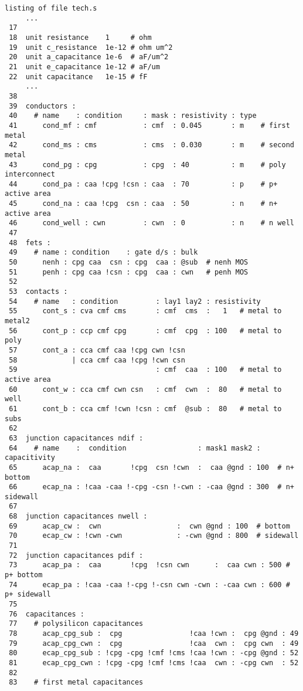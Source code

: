 \small \begin{Verbatim}[frame=single]
listing of file tech.s
     ...
 17
 18  unit resistance    1     # ohm
 19  unit c_resistance  1e-12 # ohm um^2
 20  unit a_capacitance 1e-6  # aF/um^2
 21  unit e_capacitance 1e-12 # aF/um
 22  unit capacitance   1e-15 # fF
     ...
 38
 39  conductors :
 40    # name    : condition     : mask : resistivity : type
 41      cond_mf : cmf           : cmf  : 0.045       : m    # first metal
 42      cond_ms : cms           : cms  : 0.030       : m    # second metal
 43      cond_pg : cpg           : cpg  : 40          : m    # poly interconnect
 44      cond_pa : caa !cpg !csn : caa  : 70          : p    # p+ active area
 45      cond_na : caa !cpg  csn : caa  : 50          : n    # n+ active area
 46      cond_well : cwn         : cwn  : 0           : n    # n well
 47
 48  fets :
 49    # name : condition    : gate d/s : bulk
 50      nenh : cpg caa  csn : cpg  caa : @sub  # nenh MOS
 51      penh : cpg caa !csn : cpg  caa : cwn   # penh MOS
 52
 53  contacts :
 54    # name   : condition         : lay1 lay2 : resistivity
 55      cont_s : cva cmf cms       : cmf  cms  :   1   # metal to metal2
 56      cont_p : ccp cmf cpg       : cmf  cpg  : 100   # metal to poly
 57      cont_a : cca cmf caa !cpg cwn !csn
 58             | cca cmf caa !cpg !cwn csn
 59                                 : cmf  caa  : 100   # metal to active area
 60      cont_w : cca cmf cwn csn   : cmf  cwn  :  80   # metal to well
 61      cont_b : cca cmf !cwn !csn : cmf  @sub :  80   # metal to subs
 62
 63  junction capacitances ndif :
 64    # name    :  condition                 : mask1 mask2 : capacitivity
 65      acap_na :  caa       !cpg  csn !cwn  :  caa @gnd : 100  # n+ bottom
 66      ecap_na : !caa -caa !-cpg -csn !-cwn : -caa @gnd : 300  # n+ sidewall
 67
 68  junction capacitances nwell :
 69      acap_cw :  cwn                  :  cwn @gnd : 100  # bottom
 70      ecap_cw : !cwn -cwn             : -cwn @gnd : 800  # sidewall
 71
 72  junction capacitances pdif :
 73      acap_pa :  caa       !cpg  !csn cwn      :  caa cwn : 500 # p+ bottom
 74      ecap_pa : !caa -caa !-cpg !-csn cwn -cwn : -caa cwn : 600 # p+ sidewall
 75
 76  capacitances :
 77    # polysilicon capacitances
 78      acap_cpg_sub :  cpg                !caa !cwn :  cpg @gnd : 49
 79      acap_cpg_cwn :  cpg                !caa  cwn :  cpg cwn  : 49
 80      ecap_cpg_sub : !cpg -cpg !cmf !cms !caa !cwn : -cpg @gnd : 52
 81      ecap_cpg_cwn : !cpg -cpg !cmf !cms !caa  cwn : -cpg cwn  : 52
 82
 83    # first metal capacitances

\end{Verbatim}
